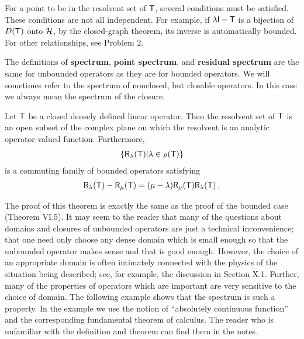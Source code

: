 For a point to be in the resolvent set of $\mathsf{T}$, several conditions must be satisfied. These conditions are not all independent. For example, if $ \lambda \mathsf{I} - \mathsf{T}$ is a bijection of $D(\mathsf{T})$ onto $\mathcal{H}$, by the closed-graph theorem, its inverse is automatically bounded. For other relationships, see Problem 2.

The definitions of \textbf{spectrum}, \textbf{point spectrum}, and \textbf{residual spectrum} are the same for unbounded operators as they are for bounded operators. We will sometimes refer to the spectrum of nonclosed, but closable operators. In this case we always mean the spectrum of the closure.

\begin{theorem}
Let $\mathsf{T}$ be a closed densely defined linear operator. Then
the resolvent set of $\mathsf{T}$ is an open subset of the complex plane on which the resolvent is an analytic operator-valued function. Furthermore,
\begin{align}
    \left \lbrace \mathsf{R}_\lambda (\mathsf{T}) | \lambda \in \rho(\mathsf{T}) \right \rbrace
\end{align}
is a commuting family of bounded operators satisfying
\begin{align}
   \mathsf{R}_\lambda(\mathsf{T}) - \mathsf{R}_\mu (\mathsf{T}) = (\mu - \lambda) \mathsf{R}_\mu (\mathsf{T}) \mathsf{R}_\lambda (\mathsf{T}) \:. 
\end{align}

\end{theorem}

The proof of this theorem is exactly the same as the proof of the bounded
case (Theorem VI.5).
It may seem to the reader that many of the questions about domains and closures of unbounded operators are just a technical inconvenience; that one need only choose any dense domain which is small enough so that the unbounded operator makes sense and that is good enough. However, the choice of an appropriate domain is often intimately connected with the physics of the situation being described; see, for example, the discussion in Section X.1.
Further, many of the properties of operators which are important are very sensitive to the choice of domain. The following example shows that the spectrum is such a property. In the example we use the notion of \enquote{absolutely continuous function} and the corresponding fundamental theorem of calculus. The reader who is unfamiliar with the definition and theorem can find them in the notes.

